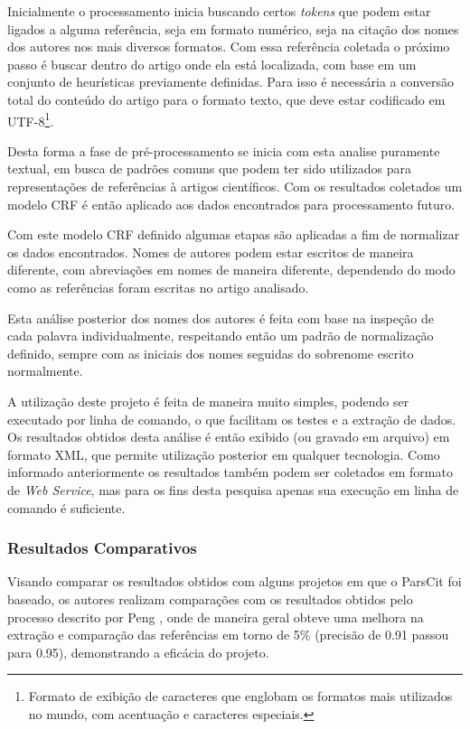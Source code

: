 Inicialmente o processamento inicia buscando certos \textit{tokens} que podem estar ligados a alguma referência, seja em formato numérico, seja na citação dos nomes dos autores nos mais diversos formatos. Com essa referência coletada o próximo passo é buscar dentro do artigo onde ela está localizada, com base em um conjunto de heurísticas previamente definidas. Para isso é necessária a conversão total do conteúdo do artigo para o formato texto, que deve estar codificado em UTF-8\footnote{Formato de exibição de caracteres que englobam os formatos mais utilizados no mundo, com acentuação e caracteres especiais.}.

Desta forma a fase de pré-processamento se inicia com esta analise puramente textual, em busca de padrões comuns que podem ter sido utilizados para representações de referências à artigos científicos. Com os resultados coletados um modelo CRF é então aplicado aos dados encontrados para processamento futuro.

Com este modelo CRF definido algumas etapas são aplicadas a fim de normalizar os dados encontrados. Nomes de autores podem estar escritos de maneira diferente, com abreviações em nomes de maneira diferente, dependendo do modo como as referências foram escritas no artigo analisado.

Esta análise posterior dos nomes dos autores é feita com base na inspeção de cada palavra individualmente, respeitando então um padrão de normalização definido, sempre com as iniciais dos nomes seguidas do sobrenome escrito normalmente.

A utilização deste projeto é feita de maneira muito simples, podendo ser executado por linha de comando, o que facilitam os testes e a extração de dados. Os resultados obtidos desta análise é então exibido (ou gravado em arquivo) em formato XML, que permite utilização posterior em qualquer tecnologia. Como informado anteriormente os resultados também podem ser coletados em formato de \textit{Web Service}, mas para os fins desta pesquisa apenas sua execução em linha de comando é suficiente.

\subsubsection{Resultados Comparativos}

Visando comparar os resultados obtidos com alguns projetos em que o ParsCit foi baseado, os autores realizam comparações com os resultados obtidos pelo processo descrito por Peng \cite{crf-ie}, onde de maneira geral obteve uma melhora na extração e comparação das referências em torno de 5\% (precisão de 0.91 passou para 0.95), demonstrando a eficácia do projeto.

